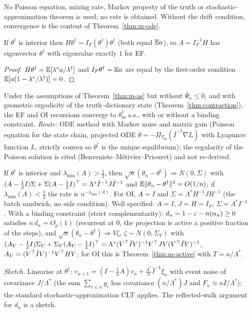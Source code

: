 No Poisson equation, mixing rate, Markov property of the truth or stochastic-approximation theorem is used; no rate is obtained. Without the drift condition, convergence is the content of Theorem~\ref{thm:m-ode}.

\begin{lemma}\label{lem:m-eigone}\Pt{}
If $\theta^\dagger$ is interior then $H\theta^\dagger=I_F(\theta^\dagger)\theta^\dagger$ (both equal $\mathbb{E} a$), so $A=I_F^{-1}H$ has eigenvector $\theta^\dagger$ with eigenvalue exactly $1$ for EF.
\end{lemma}
\begin{proof}
$H\theta^\dagger=\mathbb{E}[\lambda^*a/\lambda^\dagger]$ and $I_F\theta^\dagger=\mathbb{E} a$ are equal by the first-order condition $\mathbb{E}[a(1-\lambda^*/\lambda^\dagger)]=0$.
\end{proof}

\begin{theorem}\label{thm:m-ode}\Ps{}
Under the assumptions of Theorem~\ref{thm:m-as} but without $\bar\Psi_\kappa\le0$, and with geometric ergodicity of the truth--dictionary state (Theorem~\ref{thm:contraction}), the EF and OI recursions converge to $\theta^\dagger_\Theta$ a.s., with or without a binding constraint.
\emph{Route:} ODE method with Markov noise and matrix gain (Poisson equation for the state chain, projected ODE $\dot\theta=-\Pi_{T_\Theta}(\bar I^{-1}\nabla L)$ with Lyapunov function $L$, strictly convex so $\theta^\dagger$ is the unique equilibrium); the regularity of the Poisson solution is cited (Benveniste--M\'etivier--Priouret) and not re-derived.
\end{theorem}

\begin{theorem}\label{thm:m-clt}\Ps{}
If $\theta^\dagger$ is interior and $\lambda_{\min}(A)>\tfrac12$, then $\sqrt n(\theta_n-\theta^\dagger)\Rightarrow N(0,\Sigma)$ with $(A-\tfrac12I)\Sigma+\Sigma(A-\tfrac12I)^{\top}=\Lambda^*\bar I^{-1}J\bar I^{-1}$ and $\mathbb{E}\lVert \theta_n-\theta^\dagger\rVert^2=O(1/n)$; if $\lambda_{\min}(A)<\tfrac12$ the rate is $n^{-\lambda_{\min}(A)}$. For OI, $A=I$ and $\Sigma=\Lambda^*H^{-1}JH^{-1}$ (the batch sandwich, no side condition). Well specified: $A=I$, $J=H=I_F$, $\Sigma=\Lambda^*I^{-1}$.
With a binding constraint (strict complementarity): $d_n=1-\varepsilon-n(\alpha_n)\ge0$ satisfies $n\,d_n=O_p(1)$ (recurrent at $0$, the projection is active a positive fraction of the steps), and $\sqrt n(\theta_n-\theta^\dagger)\Rightarrow V\zeta$, $\zeta\sim N(0,\Sigma_V)$ with $(A_V-\tfrac12I)\Sigma_V+\Sigma_V(A_V-\tfrac12I)^{\top}=\Lambda^*(V^{\top}\bar IV)^{-1}V^{\top} JV(V^{\top}\bar IV)^{-1}$, $A_V=(V^{\top}\bar IV)^{-1}V^{\top} HV$; for OI this is Theorem~\ref{thm:m-active} with $T=n/\Lambda^*$.
\end{theorem}
\emph{Sketch.} Linearise at $\theta^\dagger$: $v_{n+1}=(I-\tfrac1nA)v_n+\tfrac{\Lambda^*}n\bar I^{-1}\xi_n$ with event noise of covariance $J/\Lambda^*$ (the sum $\sum_{i\le n}g_i$ has covariance $(n/\Lambda^*)J$ and $F_n\approx n\bar I/\Lambda^*$); the standard stochastic-approximation CLT applies. The reflected-walk argument for $d_n$ is a sketch.

